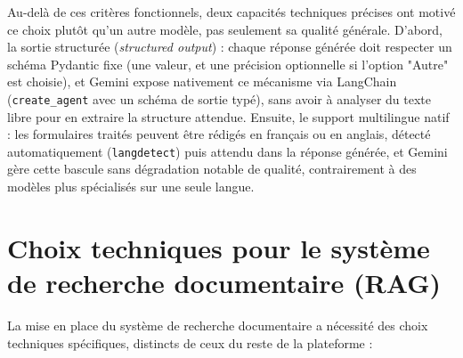 \documentclass[12pt,a4paper]{report}
\begin{document}
\begin{itemize}
    Au-delà de ces critères fonctionnels, deux capacités techniques précises ont
    motivé ce choix plutôt qu'un autre modèle, pas seulement sa qualité générale.
    D'abord, la sortie structurée (\emph{structured output}) : chaque réponse
    générée doit respecter un schéma Pydantic fixe (une valeur, et une précision
    optionnelle si l'option "Autre" est choisie), et Gemini expose nativement ce
    mécanisme via LangChain (\texttt{create\_agent} avec un schéma de sortie typé),
    sans avoir à analyser du texte libre pour en extraire la structure attendue.
    Ensuite, le support multilingue natif : les formulaires traités peuvent être
    rédigés en français ou en anglais, détecté automatiquement (\texttt{langdetect})
    puis attendu dans la réponse générée, et Gemini gère cette bascule sans
    dégradation notable de qualité, contrairement à des modèles plus spécialisés sur
    une seule langue.
\end{itemize}

\section{Choix techniques pour le système de recherche documentaire (RAG)}

La mise en place du système de recherche documentaire a nécessité des choix
techniques spécifiques, distincts de ceux du reste de la plateforme :
\end{document}

